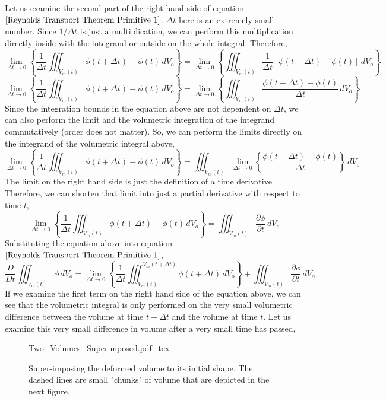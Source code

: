 Let us examine the second part of the right hand side of equation $\ref{Reynolds Transport Theorem Primitive 1}$.
$\Delta t$ here is an extremely small number. 
Since $1/\Delta t$ is just a multiplication, we can perform this multiplication directly inside with the integrand or outside on the whole integral. Therefore,
$$\lim_{\Delta t \to 0}\left\{\frac{1}{\Delta t}\iiint^{}_{V_{m}(t)} \phi(t+\Delta t) - \phi(t) \,dV_{o}\right\} = \lim_{\Delta t \to 0}\left\{\iiint^{}_{V_{m}(t)}\frac{1}{\Delta t}\left[\phi(t+\Delta t) - \phi(t)\right] \,dV_{o}\right\}$$
$$\lim_{\Delta t \to 0}\left\{\frac{1}{\Delta t}\iiint^{}_{V_{m}(t)} \phi(t+\Delta t) - \phi(t) \,dV_{o}\right\} = \lim_{\Delta t \to 0}\left\{\iiint^{}_{V_{m}(t)}\frac{\phi(t+\Delta t) - \phi(t)}{\Delta t} \,dV_{o}\right\}$$
Since the integration bounds in the equation above are not dependent on $\Delta t$, we can also perform the limit and the volumetric integration of the integrand commutatively (order does not matter).
So, we can perform the limits directly on the integrand of the volumetric integral above,
$$\lim_{\Delta t \to 0}\left\{\frac{1}{\Delta t}\iiint^{}_{V_{m}(t)} \phi(t+\Delta t) - \phi(t) \,dV_{o}\right\} = \iiint^{}_{V_{m}(t)} \lim_{\Delta t \to 0}\left\{\frac{\phi(t+\Delta t) - \phi(t)}{\Delta t}\right\} \,dV_{o}$$
The limit on the right hand side is just the definition of a time derivative.
Therefore, we can shorten that limit into just a partial derivative with respect to time $t$,
$$\lim_{\Delta t \to 0}\left\{\frac{1}{\Delta t}\iiint^{}_{V_{m}(t)} \phi(t+\Delta t) - \phi(t) \,dV_{o}\right\} = \iiint^{}_{V_{m}(t)} \frac{\partial \phi}{\partial t} \,dV_{o}$$
Substituting the equation above into equation $\ref{Reynolds Transport Theorem Primitive 1}$,
\begin{equation}\frac{D}{Dt}\iiint^{}_{V_{m}(t)} \phi \,dV_{o} = \lim_{\Delta t \to 0}\left\{\frac{1}{\Delta t}\iiint^{V_{m}(t+\Delta t)}_{V_{m}(t)} \phi(t+\Delta t) \,dV_{o}\right\} 
+ \iiint^{}_{V_{m}(t)} \frac{\partial \phi}{\partial t} \,dV_{o} \label{Reynolds Transport Theorem Primitive 2}\end{equation}
If we examine the first term on the right hand side of the equation above, we can see that the volumetric integral is only performed on the very small volumetric difference between the volume at time $t+\Delta t$ and the volume at time $t$.
Let us examine this very small difference in volume after a very small time has passed,
\begin{figure}[H]\centering
\def\svgwidth{400px}
{Two_Volumes_Superimposed.pdf_tex}
\caption{Super-imposing the deformed volume to its initial shape. The dashed lines are small "chunks" of volume that are depicted in the next figure.}
\label{Superimposed Deformed Volume Reynolds Transport Theorem}
\end{figure}

